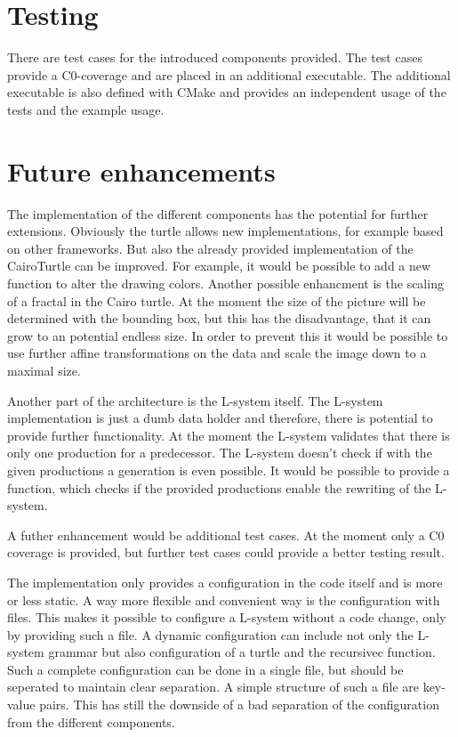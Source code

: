\documentclass[english]{cpp-hmwk}
\begin{document}
\section{Testing}
\label{section:test}
There are test cases for the introduced components provided. The test cases provide a C0-coverage and are placed in an additional executable. The additional executable is also defined with CMake and provides an independent usage of the tests and the example usage.

\section{Future enhancements}

The implementation of the different components has the potential for further extensions. Obviously the turtle allows new implementations, for example based on other frameworks. But also the already provided implementation of the CairoTurtle can be improved. For example, it would be possible to add a new function to alter the drawing colors. Another possible enhancment is the scaling of a fractal in the Cairo turtle. At the moment the size of the picture will be determined with the bounding box, but this has the disadvantage, that it can grow to an potential endless size. In order to prevent this it would be possible to use further affine transformations on the data and scale the image down to a maximal size.

\noindent Another part of the architecture is the L-system itself. The L-system implementation is just a dumb data holder and therefore, there is potential to provide further functionality. At the moment the L-system validates that there is only one production for a predecessor. The L-system doesn't check if with the given productions a generation is even possible. It would be possible to provide a function, which checks if the provided productions enable the rewriting of the L-system. 

\noindent A futher enhancement would be additional test cases. At the moment only a C0 coverage is provided, but further test cases could provide a better testing result.

\noindent The implementation only provides a configuration in the code itself and is more or less static. A way more flexible and convenient way is the configuration with files. This makes it possible to configure a L-system without a code change, only by providing such a file. A dynamic configuration can include not only the L-system grammar but also configuration of a turtle and the recursivec function. Such a complete configuration can be done in a single file, but should be seperated to maintain clear separation. A simple structure of such a file are key-value pairs. This has still the downside of a bad separation of the configuration from the different components.
\end{document}
